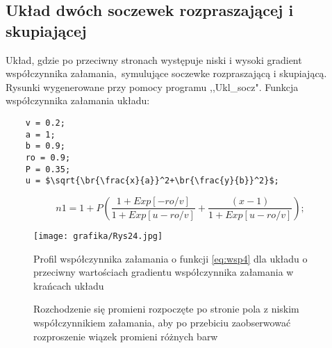 
\subsection{Układ dwóch soczewek rozpraszającej i skupiającej}
Układ, gdzie po przeciwny stronach występuje niski i wysoki gradient współczynnika załamania,~symulujące soczewke rozpraszającą i skupiającą. Rysunki wygenerowane przy pomocy programu ,,Ukl\_socz". Funkcja współczynnika załamania układu:
\begin{lstlisting}
    v = 0.2;
    a = 1;
    b = 0.9;
    ro = 0.9;
    P = 0.35;
    u = $\sqrt{\br{\frac{x}{a}}^2+\br{\frac{y}{b}}^2}$;
\end{lstlisting}
\begin{equation}\label{eq:wsp4}
    n1 = 1 + P(\frac{1 + Exp[-ro/v]}{1 + Exp[u - ro/v]}+\frac{(x - 1)}{1 + Exp[u - ro / v]});
\end{equation}
\begin{figure}[ht]
    \centering
    \texttt{[image: grafika/Rys24.jpg]}
    \caption{Profil współczynnika załamania o funkcji \ref{eq:wsp4} dla układu o przeciwny wartościach gradientu współczynnika załamania w krańcach układu}
\end{figure}
\newpage
\begin{figure}[H]
   \centering
    \caption{Rozchodzenie się promieni rozpoczęte po stronie pola z niskim współczynnikiem załamania, aby po przebiciu zaobserwować rozproszenie wiązek promieni różnych barw}
\end{figure}


